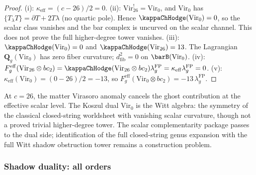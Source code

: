 \begin{proof}
(i): $\kappa_{\mathrm{eff}} = (c-26)/2 = 0$.
(ii): $\mathrm{Vir}_{26}^! = \mathrm{Vir}_0$, and
$\mathrm{Vir}_0$ has $\{T_\lambda T\} = \partial T + 2T\lambda$
(no quartic pole). Hence $\kappaChHodge(\mathrm{Vir}_0) = 0$, so the
scalar class vanishes and the bar complex is uncurved on the scalar
channel. This does not prove the full higher-degree tower vanishes.
(iii): $\kappaChHodge(\mathrm{Vir}_0) = 0$ and $\kappaChHodge(\mathrm{Vir}_{26})
= 13$. The Lagrangian $\mathbf{Q}_g(\mathrm{Vir}_0)$ has zero
fiber curvature; $d_{\mathrm{fib}}^2 = 0$ on $\barB(\mathrm{Vir}_0)$.
(iv): $F_g^{\mathrm{eff}}(\mathrm{Vir}_{26}\otimes bc_2)
= \kappaChHodge(\mathrm{Vir}_{26}\otimes bc_2)\lambda_g^{\mathrm{FP}}
= \kappa_{\mathrm{eff}}\lambda_g^{\mathrm{FP}} = 0$.
(v): $\kappa_{\mathrm{eff}}(\mathrm{Vir}_0) = (0-26)/2 = -13$,
so $F_g^{\mathrm{eff}}(\mathrm{Vir}_0 \otimes bc_2)
= -13\,\lambda_g^{\mathrm{FP}}$.
\end{proof}

At $c = 26$, the matter Virasoro anomaly cancels the ghost
contribution at the effective scalar level. The Koszul dual
$\mathrm{Vir}_0$ is the Witt algebra: the symmetry of the
classical closed-string worldsheet with vanishing scalar
curvature, though not a proved trivial higher-degree tower.
The scalar complementarity package passes to the dual side;
identification of the full closed-string genus expansion with
the full Witt shadow obstruction tower remains a construction
problem.

\subsubsection*{Shadow duality: all orders}

